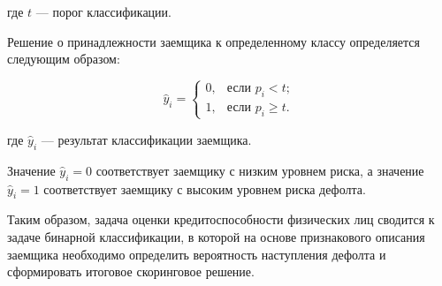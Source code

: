 \noindent где $t$ --- порог классификации.

Решение о принадлежности заемщика к определенному классу определяется следующим образом:

\begin{equation}
  \hat{y}_i =
  \begin{cases}
    0, & \text{если } p_i < t;    \\
    1, & \text{если } p_i \geq t.
  \end{cases}
\end{equation}

\noindent где $\hat{y}_i$ --- результат классификации заемщика.

Значение $\hat{y}_i = 0$ соответствует заемщику с низким уровнем риска, а значение $\hat{y}_i = 1$ соответствует заемщику с высоким уровнем риска дефолта.

Таким образом, задача оценки кредитоспособности физических лиц сводится к задаче бинарной классификации, в которой на основе признакового описания заемщика необходимо определить вероятность наступления дефолта и сформировать итоговое скоринговое решение.